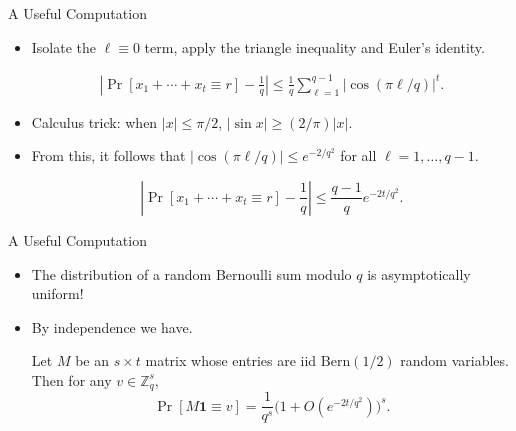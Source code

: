 \documentclass{beamer}
\theoremstyle{plain}
\newcommand{\Bern}{\text{Bern}}
\newcommand{\Z}{\mathbb{Z}}
\begin{document}
	\begin{frame}{A Useful Computation}
		\begin{itemize}
			\item Isolate the $\ell \equiv 0$ term, apply the triangle inequality and Euler's identity.

			\pause

			\begin{align*}
				\left|\Pr[x_1 + \cdots + x_t \equiv r] - \frac{1}{q}\right|\leq \frac{1}{q}\sum_{\ell = 1}^{q-1}|\cos(\pi \ell/q)|^t.
			\end{align*}

			\pause

			\item Calculus trick: when $|x|\leq \pi/2$, $|\sin x| \geq (2/\pi)|x|$.

			\pause

			\item From this, it follows that $|\cos(\pi \ell/q)|\leq e^{-2/q^2}$ for all $\ell = 1, \ldots, q-1$.

			\pause

			\[
				\left|\Pr[x_1 + \cdots + x_t \equiv r] - \frac{1}{q}\right|\leq \frac{q-1}{q}e^{-2t/q^2}.
			\]
		\end{itemize}
	\end{frame}


	\begin{frame}{A Useful Computation}
		\begin{itemize}
			\item The distribution of a random Bernoulli sum modulo $q$ is asymptotically uniform!

			\pause

			\item By independence we have.

			\begin{lemma}
				Let $M$ be an $s\times t$ matrix whose entries are iid $\Bern(1/2)$ random variables.
				Then for any $v\in \Z_q^s$,
				\[
					\Pr[M\boldsymbol{1} \equiv v] = \frac{1}{q^s}\bigg(1 + O\left(e^{-2t/q^2}\right)\bigg)^s.
				\]
			\end{lemma}	
		\end{itemize}
	\end{frame}
\end{document}
